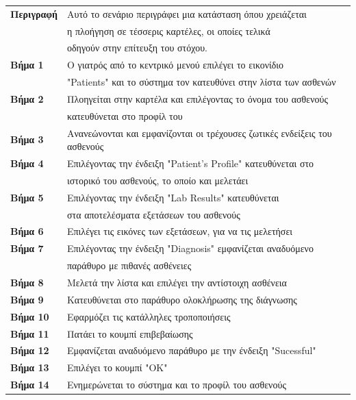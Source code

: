 \documentclass{article}
\newcommand\T{\rule{0pt}{2.6ex}}       %
\newcommand\B{\rule[-1.2ex]{0pt}{0pt}}
\begin{document}
 \begin{center}
     \begin{tabular}{|l|l|}
     \hline
      \textbf{Περιγραφή} & Αυτό το σενάριο περιγράφει μια κατάσταση όπου χρειάζεται \T \\& η πλοήγηση σε τέσσερις καρτέλες, οι οποίες τελικά\\& οδηγούν στην επίτευξη του στόχου. \B \\ 
      \hline
      \textbf{Βήμα 1} & Ο γιατρός από το κεντρικό μενού επιλέγει το εικονίδιο \T \\& "Patients" και το σύστημα τον κατευθύνει στην λίστα των ασθενών \B \\
      \hline
      \textbf{Βήμα 2} & Πλοηγείται στην καρτέλα και επιλέγοντας το όνομα του ασθενούς \T \\& κατευθύνεται στο προφίλ του  \B \\
      \hline
      \textbf{Βήμα 3} & Ανανεώνονται και εμφανίζονται οι τρέχουσες ζωτικές ενδείξεις του ασθενούς \T\B \\
      \hline
      \textbf{Βήμα 4} & Επιλέγοντας την ένδειξη "Patient's Profile" κατευθύνεται στο \T\\& ιστορικό του ασθενούς, το οποίο και μελετάει \B \\
      \hline
      \textbf{Βήμα 5} & Επιλέγοντας την ένδειξη "Lab Results" κατευθύνεται \T \\& στα αποτελέσματα εξετάσεων του ασθενούς \B \\
      \hline
      \textbf{Βήμα 6} & Επιλέγει τις εικόνες των εξετάσεων, για να τις μελετήσει \T\B \\
      \hline
      \textbf{Βήμα 7} & Επιλέγοντας την ένδειξη "Diagnosis" εμφανίζεται αναδυόμενο \T \\& παράθυρο με πιθανές ασθένειες \B \\
      \hline
      \textbf{Βήμα 8} & Μελετά την λίστα και επιλέγει την αντίστοιχη ασθένεια\T\B \\
      \hline      
      \textbf{Βήμα 9} & Κατευθύνεται στο παράθυρο ολοκλήρωσης της διάγνωσης \T\B \\
      \hline
      \textbf{Βήμα 10} & Εφαρμόζει τις κατάλληλες τροποποιήσεις \T\B \\
      \hline
      \textbf{Βήμα 11} & Πατάει το κουμπί επιβεβαίωσης \T\B \\
      \hline
      \textbf{Βήμα 12} & Εμφανίζεται αναδυόμενο παράθυρο με την ένδειξη "Sucessful" \T\B \\
      \hline    
      \textbf{Βήμα 13} & Επιλέγει το κουμπί "ΟΚ"\T\B \\ 
      \hline
      \textbf{Βήμα 14} & Ενημερώνεται το σύστημα και το προφίλ του ασθενούς \T\B \\
      \hline
     \end{tabular}
 \end{center}
 
\end{document}
